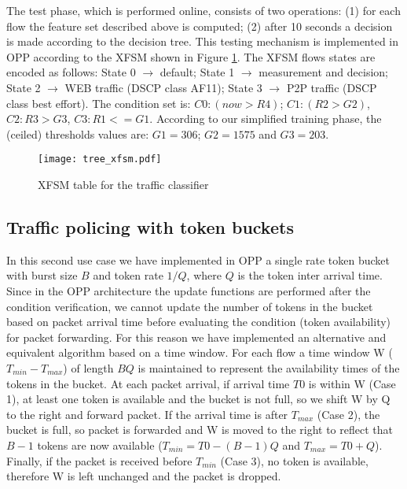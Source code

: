 \documentclass{sig-alternate}
\begin{document}
The test phase, which is performed online, consists of two operations: (1) for each flow the feature set described above is computed; (2) after 10 seconds a decision is made according to the decision tree. This testing mechanism is implemented in OPP according to the XFSM shown in Figure \ref{fig:tree}. The XFSM flows states are encoded as follows: State 0 $\rightarrow$ default; State 1 $\rightarrow$ measurement and decision; State 2 $\rightarrow$ WEB traffic (DSCP class AF11); State 3 $\rightarrow$ P2P traffic (DSCP class best effort). The condition set is:  $C0: (now > R4)$;  $C1: (R2 > G2)$, $C2: R3 > G3$, $C3: R1 <= G1$. According to our simplified training phase, the (ceiled) thresholds  values are: $G1 = 306$; $G2= 1575$ and $G3 = 203$. 

\begin{figure}[t]
   \centering
   \texttt{[image: tree\_xfsm.pdf]}            	  \vspace{-1em}

   \caption{XFSM table for the traffic classifier}
            	  \vspace{-1.5em}
   \label{fig:tree}
\end{figure}

\subsection{Traffic policing with token buckets}
In this second use case we have implemented in OPP a single rate token bucket with burst size $B$ and token rate $1/Q$, where $Q$ is the token inter arrival time. Since in the OPP architecture the update functions are performed after the condition verification, we cannot update the number of tokens in the bucket based on packet arrival time before evaluating the condition (token availability) for packet forwarding. For this reason we have implemented an alternative and  equivalent algorithm based on a time window. For each flow a time window W ($T_{min} - T_{max}$) of length $BQ$ is maintained to represent the availability times of the tokens in the bucket. At each packet arrival, if arrival time $T0$ is within W (Case 1), at least one token is available and the bucket is not full, so we shift W by Q to the right and forward packet. If the arrival time is after $T_{max}$ (Case 2), the bucket is full, so packet is forwarded and W is moved to the right to reflect that $B-1$ tokens are now available ($T_{min}=T0-(B-1)Q$ and $T_{max}=T0+Q$). Finally, if the packet is received before $T_{min}$ (Case 3), no token is available, therefore W is left unchanged and the packet is dropped.
\end{document}
